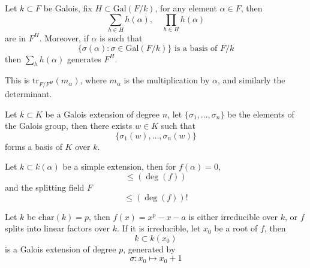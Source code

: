 \documentclass[openany]{book}
\newcommand{\tr}{\text{tr}}
\newcommand{\gal}{\text{Gal}}
\begin{document}
\begin{prop}
    Let $k\subset F$ be Galois, fix $H\subset\gal(F/k)$, for any element $\alpha\in F$, then 
    \begin{equation*}
        \sum_{h\in H}h(\alpha), \quad \prod_{h\in H}h(\alpha)
    \end{equation*}
    are in $F^H$. Moreover, if $\alpha$ is such that 
    \begin{equation*}
        \{\sigma(\alpha):\sigma\in\gal(F/k)\} \text{ is a basis of } F/k
    \end{equation*}
    then $\sum_{h}h(\alpha)$ generates $F^H$.
\end{prop}

This is $\tr_{F/F^H}(m_\alpha)$, where $m_\alpha$ is the multiplication by $\alpha$, and similarly the determinant.









\begin{prop}
    Let $k\subset K$ be a Galois extension of degree $n$, let $\{\sigma_1,\dots,\sigma_n\}$ be the elements of the Galois group, then there exists $w\in K$ such that 
    \begin{equation*}
        \{\sigma_1(w),\dots, \sigma_n(w)\}
    \end{equation*}
    forms a basis of $K$ over $k$.
\end{prop}





\begin{prop}
    Let $k\subset k(\alpha)$ be a simple  extension, then for $f(\alpha)=0$, 
    \begin{equation*}
        [k(\alpha):k]\leq (\deg(f))
    \end{equation*}
    and the splitting field $F$ 
    \begin{equation*}
        [F:k]\leq (\deg(f))!
    \end{equation*}
\end{prop}




\begin{prop}
    Let $k$ be $\text{char}(k)=p$, then $f(x)=x^p-x-a$ is either irreducible over $k$, or $f$ splits into linear factors over $k$. If it is irreducible, let $x_0$ be a root of $f$, then 
    \begin{equation*}
        k\subset k(x_0)
    \end{equation*}
    is a Galois extension of degree $p$, generated by 
    \begin{equation*}
        \sigma: x_0\mapsto x_0+1
    \end{equation*}
\end{prop}
\end{document}
